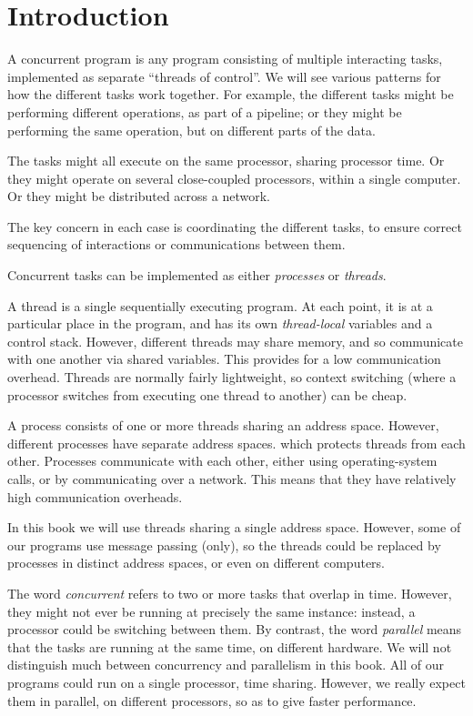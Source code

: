 \chapter{Introduction}
\label{chap:intro}

A concurrent program is any program consisting of multiple interacting tasks,
implemented as separate ``threads of control''.  We will see various patterns
for how the different tasks work together.  For example, the different tasks
might be performing different operations, as part of a pipeline; or they might
be performing the same operation, but on different parts of the data.

The tasks might all execute on the same processor, sharing processor time.  Or
they might operate on several close-coupled processors, within a single
computer.  Or they might be distributed across a network.

The key concern in each case is coordinating the different tasks, to ensure
correct sequencing of interactions or communications between them.


Concurrent tasks can be implemented as either \emph{processes} or
\emph{threads}.

A thread is a single sequentially executing program.  At each point, it is at
a particular place in the program, and has its own \emph{thread-local}
variables and a control stack.  However, different threads may share memory,
and so communicate with one another via shared variables.  This provides for a
low communication overhead.  Threads are normally fairly lightweight, so
context switching (where a processor switches from executing one thread to
another) can be cheap.

A process consists of one or more threads sharing an address space.  However,
different processes have separate address spaces. which protects threads from
each other.  Processes communicate with each other, either using
operating-system calls, or by communicating over a network.  This means that
they have relatively high communication overheads.

In this book we will use threads sharing a single address space.  However,
some of our programs use message passing (only), so the threads could be
replaced by processes in distinct address spaces, or even on different
computers.

The word \emph{concurrent} refers to two or more tasks that overlap in time.
However, they might not ever be running at precisely the same instance:
instead, a processor could be switching between them.  By contrast, the word
\emph{parallel} means that the tasks are running at the same time, on
different hardware.  We will not distinguish much between concurrency and
parallelism in this book.  All of our programs could run on a single
processor, time sharing.  However, we really expect them in parallel, on
different processors, so as to give faster performance. 

